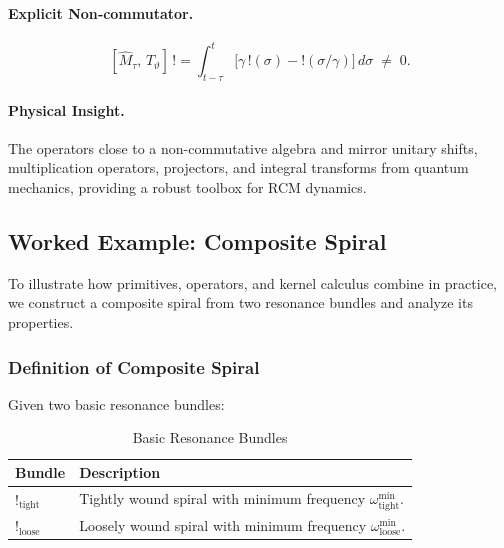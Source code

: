 \paragraph{Explicit Non‐commutator.}
\begin{equation}
\label{eq:3-6}

  [\hat{M}_{\tau},\,T_{\vartheta}]\,!
  = \int_{t-\tau}^{t}
    \bigl[\gamma\,!(\sigma) - !(\sigma/\gamma)\bigr]\,d\sigma
  \;\neq\;0.
\end{equation}

\paragraph{Physical Insight.}  
The operators close to a non-commutative algebra and mirror unitary shifts, multiplication operators, projectors, and integral transforms from quantum mechanics, providing a robust toolbox for RCM dynamics.


\subsection{Worked Example: Composite Spiral}
\label{subsec3:worked-example-composite-spiral}

To illustrate how primitives, operators, and kernel calculus combine in practice, we construct a composite spiral from two resonance bundles and analyze its properties.

\subsubsection{Definition of Composite Spiral}

Given two basic resonance bundles:

\begin{table}[H]
  \centering
  \caption{Basic Resonance Bundles}
  \label{tab:composite-bundles}
  \begin{tabular}{@{}ll@{}}
    \toprule
    \textbf{Bundle} & \textbf{Description} \\
    \midrule
    $!_{\mathrm{tight}}$ & Tightly wound spiral with minimum frequency $\omega_{\mathrm{tight}}^{\min}$. \\
    $!_{\mathrm{loose}}$ & Loosely wound spiral with minimum frequency $\omega_{\mathrm{loose}}^{\min}$. \\
    \bottomrule
  \end{tabular}
\end{table}

